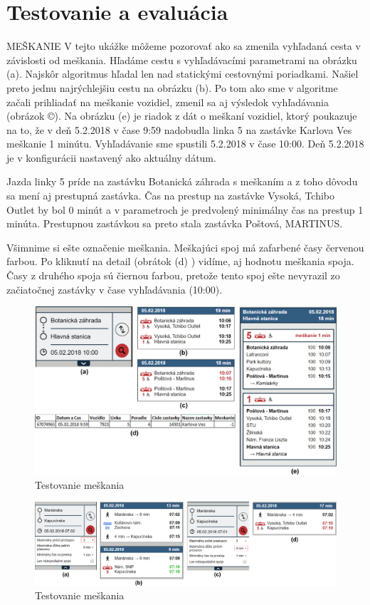 \chapter{Testovanie a evaluácia}
\label{kap:tes}

MEŠKANIE
V tejto ukážke môžeme pozorovať ako sa zmenila vyhľadaná cesta v závislosti od meškania. 
Hľadáme cestu s vyhľadávacími parametrami na obrázku (a). Najskôr algoritmus hľadal len nad statickými cestovnými poriadkami. Našiel preto jednu najrýchlejšiu cestu na obrázku (b). 
Po tom ako sme v algoritme začali prihliadať na meškanie vozidiel, zmenil sa aj výsledok vyhľadávania (obrázok ©). 
Na obrázku (e) je riadok z dát o meškaní vozidiel, ktorý poukazuje na to, že v deň 5.2.2018 v čase 9:59 nadobudla linka 5 na zastávke Karlova Ves meškanie 1 minútu. Vyhľadávanie sme spustili 5.2.2018 v čase 10:00. Deň 5.2.2018 je v konfigurácii nastavený ako aktuálny dátum. 

Jazda linky 5 príde na zastávku Botanická záhrada s meškaním a z toho dôvodu sa mení aj prestupná zastávka. Čas na prestup na zastávke Vysoká, Tchibo Outlet by bol 0 minút a v parametroch je predvolený minimálny čas na prestup 1 minúta. Prestupnou zastávkou sa preto stala zastávka Poštová, MARTINUS.

Všimnime si ešte označenie meškania. Meškajúci spoj má zafarbené časy červenou farbou. Po kliknutí na detail (obrátok (d) ) vidíme, aj hodnotu meškania spoja. Časy z druhého spoja sú čiernou farbou, pretože tento spoj ešte nevyrazil zo začiatočnej zastávky v čase vyhľadávania (10:00).

\begin{figure}[H]
\centerline{\includegraphics[width=1.0\textwidth]{images/test-delay1}}
\caption[Testovanie meškania]{Testovanie meškania}
\label{fig:test-delay}
\end{figure}

\begin{figure}[H]
\centerline{\includegraphics[width=1.0\textwidth]{images/mf-3}}
\caption[Testovanie meškania]{Testovanie meškania}
\label{fig:test-delay}
\end{figure}

